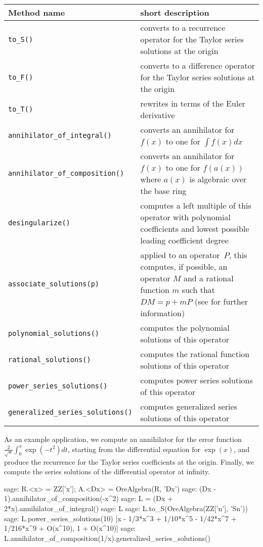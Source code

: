 \documentclass[11pt]{amsart}
\begin{document}
\begin{center}
  \begin{tabular}{|l|p{.55\hsize}|}
    \hline
    Method name & short description \\\hline
    \verb|to_S()| & converts to a recurrence operator for the Taylor series solutions at the origin \\
    \verb|to_F()| & converts to a difference operator for the Taylor series solutions at the origin \\
    \verb|to_T()| & rewrites in terms of the Euler derivative \\
    \verb|annihilator_of_integral()| & converts an annihilator for $f(x)$ to one for $\int f(x) dx$\\
    \verb|annihilator_of_composition()| & converts an annihilator for $f(x)$ to one for $f(a(x))$ where $a(x)$ is algebraic over the base ring\\
    \verb|desingularize()| & computes a left multiple of this operator with polynomial coefficients and 
           lowest possible leading coefficient degree\\
    \verb|associate_solutions(p)| & applied to an operator~$P$, this computes, if possible, an operator $M$
    and a rational function $m$ such that $DM=p+mP$ (see \cite{abramov99} for further information)\\
    \verb|polynomial_solutions()| & computes the polynomial solutions of this operator\\
    \verb|rational_solutions()| & computes the rational function solutions of this operator\\
    \verb|power_series_solutions()| & computes power series solutions of this operator\\
    \verb|generalized_series_solutions()| & computes generalized series solutions of this operator \\ \hline
  \end{tabular}
\end{center}

\smallskip

As an example application, we compute an annihilator for the error function
$\frac{2}{\sqrt{\pi}} \int_0^x \exp(-t^2) dt$, starting from the differential
equation for $\exp(x)$, and produce the recurrence for the Taylor series
coefficients at the origin. Finally, we compute the series solutions of the
differential operator at infinity. 

\begin{sageexample}
  sage: R.<x> = ZZ['x']; A.<Dx> = OreAlgebra(R, 'Dx')                            
  sage: (Dx - 1).annihilator_of_composition(-x^2)
  sage: L = (Dx + 2*x).annihilator_of_integral()                                     
  sage: L
  sage: L.to_S(OreAlgebra(ZZ['n'], 'Sn'))                          
  sage: L.power_series_solutions(10)                               
  [x - 1/3*x^3 + 1/10*x^5 - 1/42*x^7 + 1/216*x^9 + O(x^10), 1 + O(x^10)]
  sage: L.annihilator_of_composition(1/x).generalized_series_solutions()
\end{sageexample}
\end{document}
